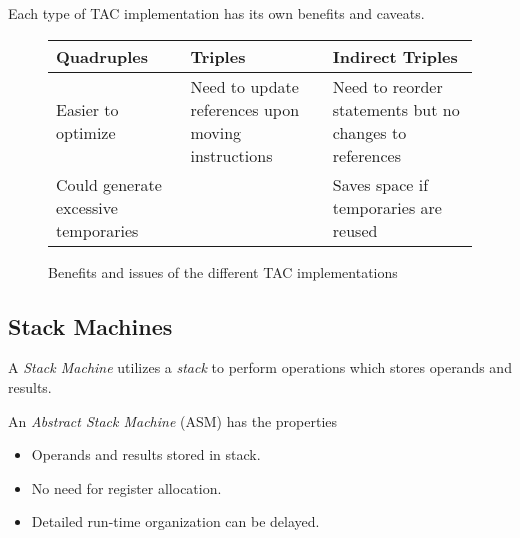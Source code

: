 \begin{remark}
    Each type of TAC implementation has its own benefits and caveats.
    \begin{figure}[H]
        \centering
        \begin{tabularx}{\textwidth}{@{} X X X @{}}
            \toprule
            Quadruples & Triples & Indirect Triples \\
            \midrule
            Easier to optimize
            & Need to update references upon moving instructions
            & Need to reorder statements but no changes to references \\
            Could generate excessive temporaries 
            &
            & Saves space if temporaries are reused \\
            \bottomrule
        \end{tabularx}
        \caption{Benefits and issues of the different TAC implementations}
        \label{fig:tac-implemenations-evaluation}
    \end{figure}
\end{remark}

\subsection{Stack Machines}

\begin{definition}
    A \textit{Stack Machine} utilizes a \textit{stack} to perform operations which stores operands and results.
\end{definition}

\begin{definition}
    An \textit{Abstract Stack Machine} (ASM) has the properties
    \begin{itemize}
        \item Operands and results stored in stack.
        \item No need for register allocation.
        \item Detailed run-time organization can be delayed.
    \end{itemize}
\end{definition}

